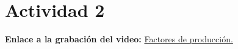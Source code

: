 \justify
\fontsize{12pt}{14}\
\setlength{\parindent}{0cm}

\clearpage
\section{Actividad 2}
\normalsize \textbf{Enlace a la grabación del video:} \href{https://1drv.ms/v/s!AvJq9wghbcuHgoM5GuvGIbDEuzAsUA?e=eNXhYZ}{Factores de producción.}
